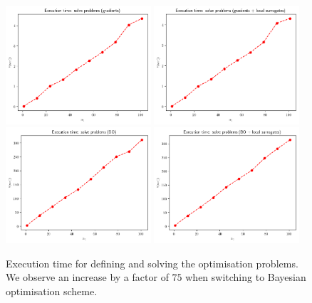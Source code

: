 \begin{figure}[ht]
    \begin{center}
      \includegraphics[width=0.48\textwidth]{./Thesis/images/chapter4/exec_solve_grad.png}
      \includegraphics[width=0.48\textwidth]{./Thesis/images/chapter4/exec_solve_grad_fit.png}\\
      \includegraphics[width=0.48\textwidth]{./Thesis/images/chapter4/exec_solve_bo.png}
      \includegraphics[width=0.48\textwidth]{./Thesis/images/chapter4/exec_solve_bo_fit.png}          \end{center}
    \caption[Execution time for solving the optimisation problems.]{Execution time for defining and solving the optimisation
      problems. We observe an increase by a factor of $75$ when switching
      to Bayesian optimisation scheme.}
  \label{fig:exec_solve}
\end{figure}


